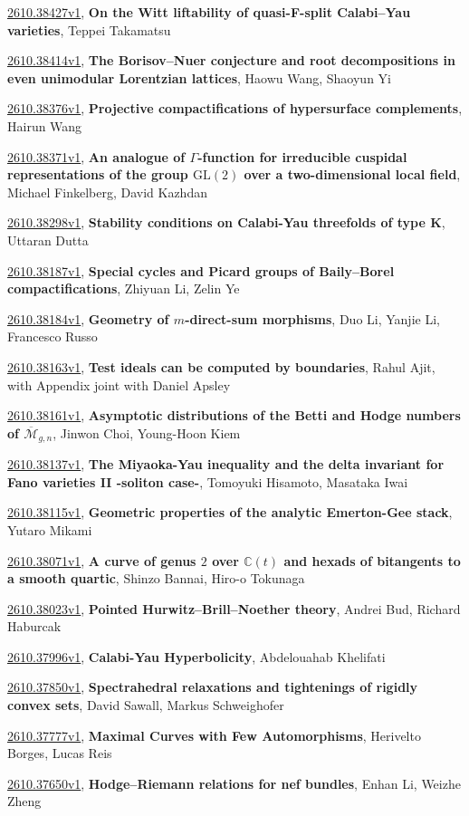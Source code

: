 \documentclass[9pt, a4paper]{article}
\theoremstyle{plain}
\theoremstyle{definition}
\theoremstyle{remark}
\newcommand{\arxiv}[3]{\href{https://arxiv.org/abs/#1}{#1}, \textbf{\textcolor{arxivblue}{#2}}, #3}
\begin{document}
\arxiv{2610.38427v1}{On the Witt liftability of quasi-F-split Calabi--Yau varieties}{Teppei Takamatsu}

\arxiv{2610.38414v1}{The Borisov--Nuer conjecture and root decompositions in even unimodular Lorentzian lattices}{Haowu Wang, Shaoyun Yi}

\arxiv{2610.38376v1}{Projective compactifications of hypersurface complements}{Hairun Wang}

\arxiv{2610.38371v1}{An analogue of $Γ$-function for irreducible cuspidal representations of the group $\mathrm{GL}(2)$ over a two-dimensional local field}{Michael Finkelberg, David Kazhdan}

\arxiv{2610.38298v1}{Stability conditions on Calabi-Yau threefolds of type K}{Uttaran Dutta}

\arxiv{2610.38187v1}{Special cycles and Picard groups of Baily--Borel compactifications}{Zhiyuan Li, Zelin Ye}

\arxiv{2610.38184v1}{Geometry of $m$-direct-sum morphisms}{Duo Li, Yanjie Li, Francesco Russo}

\arxiv{2610.38163v1}{Test ideals can be computed by boundaries}{Rahul Ajit, with Appendix joint with Daniel Apsley}

\arxiv{2610.38161v1}{Asymptotic distributions of the Betti and Hodge numbers of $\overline{\mathcal M}_{g,n}$}{Jinwon Choi, Young-Hoon Kiem}

\arxiv{2610.38137v1}{The Miyaoka-Yau inequality and the delta invariant for Fano varieties II -soliton case-}{Tomoyuki Hisamoto, Masataka Iwai}

\arxiv{2610.38115v1}{Geometric properties of the analytic Emerton-Gee stack}{Yutaro Mikami}

\arxiv{2610.38071v1}{A curve of genus $2$ over $\mathbb{C}(t)$ and hexads of bitangents to a smooth quartic}{Shinzo Bannai, Hiro-o Tokunaga}

\arxiv{2610.38023v1}{Pointed Hurwitz--Brill--Noether theory}{Andrei Bud, Richard Haburcak}

\arxiv{2610.37996v1}{Calabi-Yau Hyperbolicity}{Abdelouahab Khelifati}

\arxiv{2610.37850v1}{Spectrahedral relaxations and tightenings of rigidly convex sets}{David Sawall, Markus Schweighofer}

\arxiv{2610.37777v1}{Maximal Curves with Few Automorphisms}{Herivelto Borges, Lucas Reis}

\arxiv{2610.37650v1}{Hodge--Riemann relations for nef bundles}{Enhan Li, Weizhe Zheng}
\end{document}
